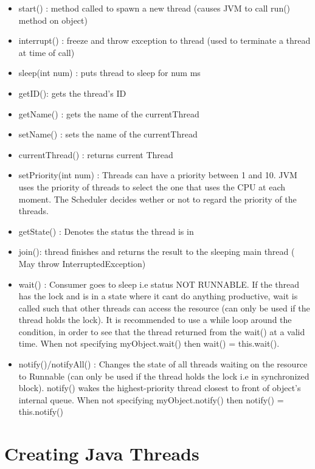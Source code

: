 \documentclass[8pt]{extreport}
\begin{document}
\begin{itemize}
\item start() : method called to spawn a new thread (causes JVM to call run() method on object)
\item interrupt() : freeze and throw exception to thread (used to terminate a thread at time of call)
\item sleep(int num) : puts thread to sleep for num ms
\item getID(): gets the thread's ID
\item getName() : gets the name of the currentThread
\item setName() : sets the name of the currentThread
\item currentThread() : returns current Thread
\item setPriority(int num) : Threads can have a priority between 1 and 10. JVM uses the priority of threads to select the one that uses the CPU at each moment. The Scheduler decides wether or not to regard the priority of the threads.
\item getState() : Denotes the status the thread is in
\item join(): thread finishes and returns the result to the sleeping main thread ( May throw InterruptedException)
\item wait() : Consumer goes to sleep i.e status NOT RUNNABLE. If the thread has the lock and is in a state where it cant do anything productive, wait is called such that other threads can access the resource (can only be used if the thread holds the lock). It is recommended to use a while loop around the condition, in order to see that the thread returned from the wait() at a valid time. When not specifying myObject.wait() then wait() = this.wait().
\item notify()/notifyAll() : Changes the state of all threads waiting on the resource to Runnable (can only be used if the thread holds the lock i.e in synchronized block). notify() wakes the highest-priority thread closest to front of object's internal queue. When not specifying myObject.notify() then notify() = this.notify()
\end{itemize}


\section{Creating Java Threads}
\end{document}
